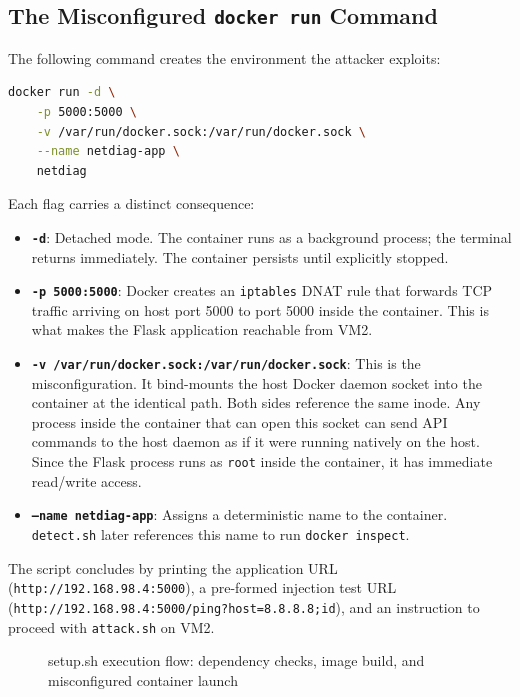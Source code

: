 \subsection{The Misconfigured \texttt{docker run} Command}

The following command creates the environment the attacker exploits:

\begin{lstlisting}[language=bash]
docker run -d \
    -p 5000:5000 \
    -v /var/run/docker.sock:/var/run/docker.sock \
    --name netdiag-app \
    netdiag
\end{lstlisting}

Each flag carries a distinct consequence:

\begin{itemize}
    \item \textbf{\texttt{-d}}: Detached mode. The container runs as a background process; the terminal returns immediately. The container persists until explicitly stopped.
    \item \textbf{\texttt{-p 5000:5000}}: Docker creates an \texttt{iptables} DNAT rule that forwards TCP traffic arriving on host port 5000 to port 5000 inside the container. This is what makes the Flask application reachable from VM2.
    \item \textbf{\texttt{-v /var/run/docker.sock:/var/run/docker.sock}}: This is the misconfiguration. It bind-mounts the host Docker daemon socket into the container at the identical path. Both sides reference the same inode. Any process inside the container that can open this socket can send API commands to the host daemon as if it were running natively on the host. Since the Flask process runs as \texttt{root} inside the container, it has immediate read/write access.
    \item \textbf{\texttt{--name netdiag-app}}: Assigns a deterministic name to the container. \texttt{detect.sh} later references this name to run \texttt{docker inspect}.
\end{itemize}

The script concludes by printing the application URL (\texttt{http://192.168.98.4:5000}), a pre-formed injection test URL (\texttt{http://192.168.98.4:5000/ping?host=8.8.8.8;id}), and an instruction to proceed with \texttt{attack.sh} on VM2.

\begin{figure}[h]
\centering
\vspace{3cm}
\caption{setup.sh execution flow: dependency checks, image build, and misconfigured container launch}
\end{figure}

